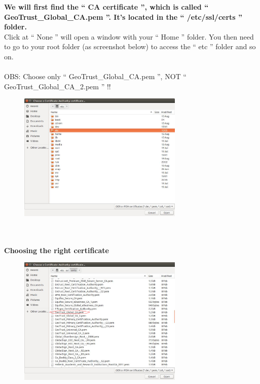 \documentclass[a4paper]{article}
\begin{document}
\noindent
\textbf{We will first find the `` CA certificate '', which is called `` GeoTrust\_Global\_CA.pem ''. It's located in the `` /etc/ssl/certs '' folder.}\\
Click at `` None '' will open a window with your `` Home '' folder. You then need to go to your root folder (as screenshot below) to access the `` etc '' folder and so on.\\\\
OBS: Choose only `` GeoTrust\_Global\_CA.pem '', NOT `` GeoTrust\_Global\_CA\_2.pem '' !!
\begin{figure}[h!]
  \centering
  \includegraphics[width=0.7\textwidth]{pic3.jpg}
\end{figure}\\\\

\noindent
\textbf{Choosing the right certificate}\\
\begin{figure}[h!]
  \centering
  \includegraphics[width=0.7\textwidth]{pic3a.jpg}
\end{figure}\\\\
\end{document}
